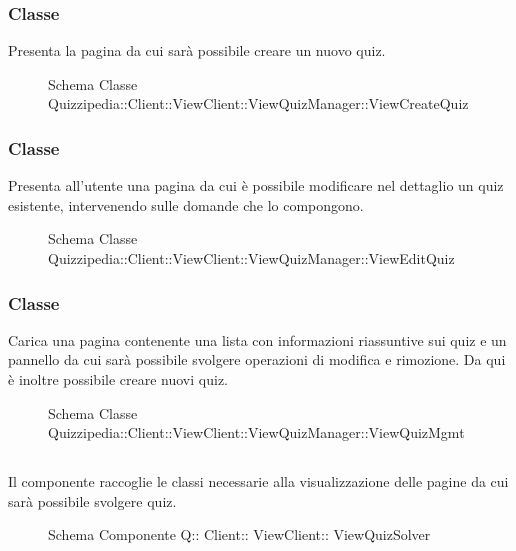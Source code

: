 \subsubsection{Classe }
Presenta la pagina da cui sarà possibile creare un nuovo quiz.
\begin{figure}[H]
\centering
\noindent{}
\caption[Schema Classe ViewCreateQuiz]{Schema Classe Quizzipedia::Client::ViewClient::ViewQuizManager::ViewCreateQuiz}
\end{figure}
\subsubsection{Classe }
Presenta all'utente una pagina da cui è possibile modificare nel dettaglio un quiz esistente, intervenendo sulle domande che lo compongono.
\begin{figure}[H]
\centering
\noindent{}
\caption[Schema Classe ViewEditQuiz]{Schema Classe Quizzipedia::Client::ViewClient::ViewQuizManager::ViewEditQuiz}
\end{figure}
\subsubsection{Classe }
Carica una pagina contenente una lista con informazioni riassuntive sui quiz e un pannello da cui sarà possibile svolgere operazioni di modifica e rimozione. Da qui è inoltre possibile creare nuovi quiz.
\begin{figure}[H]
\centering
\noindent{}
\caption[Schema Classe ViewQuizMgmt]{Schema Classe Quizzipedia::Client::ViewClient::ViewQuizManager::ViewQuizMgmt}
\end{figure}
\subsection{}
Il componente raccoglie le classi necessarie alla visualizzazione delle pagine da cui sarà possibile svolgere quiz.
\begin{figure}[H]
\centering
\noindent{}
\caption[Schema Componente Quizzipedia::Client::ViewClient::ViewQuizSolver]{Schema Componente Q:: Client:: ViewClient:: ViewQuizSolver}
\end{figure}
